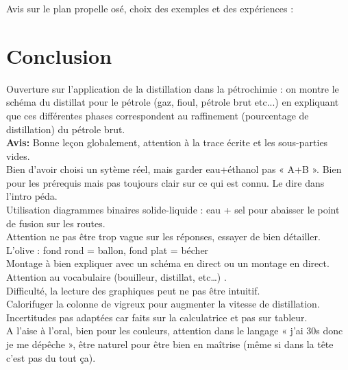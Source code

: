\begin{reportBlock}{Avis sur le plan propelle osé, choix des exemples et des expériences : }
\section*{Conclusion}
Ouverture sur l'application de la distillation dans la pétrochimie : on montre le schéma du distillat pour le pétrole (gaz, fioul, pétrole brut etc...) en expliquant que ces différentes phases correspondent au raffinement (pourcentage de distillation) du pétrole brut.\\

\textbf{Avis:} Bonne leçon globalement, attention à la trace écrite et les sous-parties vides.\\
Bien d’avoir choisi un sytème réel, mais garder eau+éthanol pas « A+B ». Bien pour les prérequis mais pas toujours clair sur ce qui est connu. Le dire dans l’intro péda.\\
Utilisation diagrammes binaires solide-liquide : eau + sel pour abaisser le point de fusion sur les routes.\\
Attention ne pas être trop vague sur les réponses, essayer de bien détailler.\\
L’olive : fond rond = ballon, fond plat = bécher\\
Montage à bien expliquer avec un schéma en direct ou un montage en direct. Attention au vocabulaire (bouilleur, distillat, etc…) .\\
Difficulté, la lecture des graphiques peut ne pas être intuitif. \\
Calorifuger la colonne de vigreux pour augmenter la vitesse de distillation. \\
Incertitudes pas adaptées car faits sur la calculatrice et pas sur tableur.\\
A l’aise à l’oral, bien pour les couleurs, attention dans le langage « j’ai 30s donc je me dépêche », être naturel pour être bien en maîtrise (même si dans la tête c’est pas du tout ça).

\end{reportBlock}

